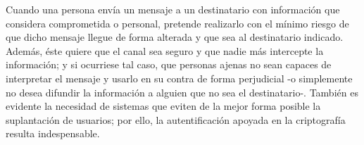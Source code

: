 \documentclass[../PFC.tex]{subfiles}
\begin{document}
Cuando una persona envía un mensaje a un destinatario con información que considera comprometida o personal, pretende realizarlo con el mínimo riesgo de que dicho mensaje llegue de forma alterada y que sea al destinatario indicado. Además, éste quiere que el canal sea seguro y que nadie más intercepte la información; y si ocurriese tal caso, que personas ajenas no sean capaces de interpretar el mensaje y usarlo en su contra de forma perjudicial -o simplemente no desea difundir la información a alguien que no sea el destinatario-. También es evidente la necesidad de sistemas que eviten de la mejor forma posible la suplantación de usuarios; por ello, la autentificación apoyada en la criptografía resulta indespensable.

\end{document}

